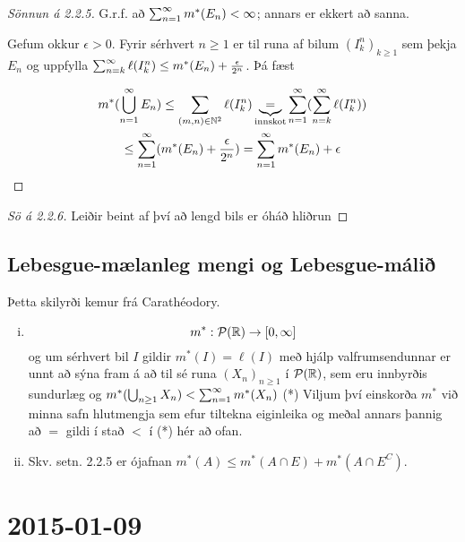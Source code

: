 \documentclass[12pt]{book}
\newcommand{\cP}{\mathcal{P}}
\begin{document}
\begin{proof}[Sönnun á 2.2.5]
  G.r.f. að $\sum_{n = 1}^{\infty} m^*(E_n) < \infty$; annars er ekkert að sanna.

      Gefum okkur $\epsilon > 0$. Fyrir sérhvert $n \geq 1$ er til runa af bilum
      $(I^n_k)_{k \geq 1}$ sem þekja $E_n$ og uppfylla
      $\sum_{n = {k}}^{\infty} \ell(I^n_k) \leq m^*(E_n) + \frac{\epsilon}{2^n}$. Þá fæst

      \begin{gather*}
        m^*(\bigcup_{n=1}^{\infty} E_n) \leq \sum_{(m,n) \in \mathbb{N}^2} \ell(I_k^n)
          \underbrace{=}_{\text{innskot}} \sum_{n = 1}^{\infty} (\sum_{n = {k}}^{\infty} \ell(I^n_k))\\
          \leq \sum_{n = 1}^{\infty} (m^*(E_n) + \frac{\epsilon}{2^n}) = \sum_{n = 1}^{\infty} m^*(E_n) + \epsilon
      \end{gather*}
        
\end{proof}
\begin{proof}[Sö á 2.2.6]
     Leiðir beint af því að lengd bils er óháð hliðrun 
\end{proof}

\section{Lebesgue-mælanleg mengi og Lebesgue-málið}

Þetta skilyrði kemur frá Carathéodory.

\begin{ath} 
  \begin{enumerate}[(i)] 
  \item \[m^*:  \cP(\R) \to [0, \infty] \]
    og um sérhvert bil $I$ gildir $m^{*}(I) = \ell(I)$
    með hjálp valfrumsendunnar er unnt að sýna fram á að til sé runa
    $(X_n)_{n\geq1}$ í $\cP(\R)$, sem eru innbyrðis sundurlæg og $m^*(\bigcup_{n\geq1}X_n) < \sum_{n = 1}^{\infty} m^*(X_n)$ (*)
    Viljum því einskorða $ m^* $ við minna safn hlutmengja sem efur tiltekna eiginleika og meðal annars þannig að $=$ gildi
    í stað $<$ í (*) hér að ofan.

  \item Skv. setn. 2.2.5 er ójafnan $m^*(A) \leq m^*(A\cap E) + m^*(A \cap E^C)$.
     
  \end{enumerate}
\end{ath}

\chapter{2015-01-09}
\end{document}
